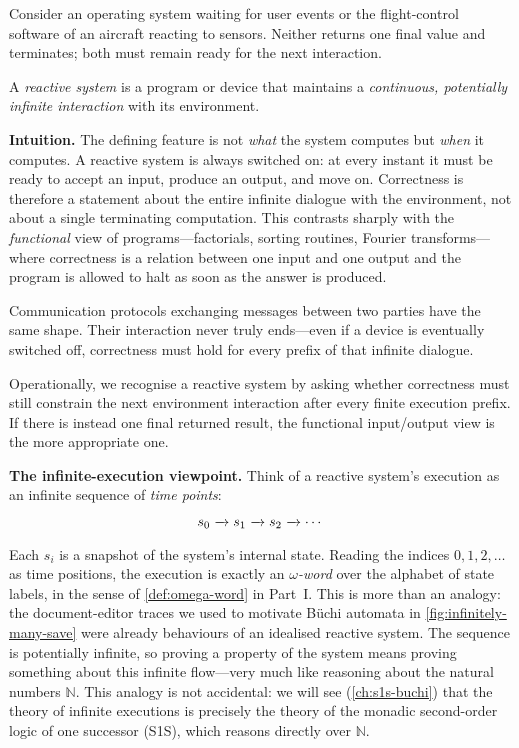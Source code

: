 Consider an operating system waiting for user events or the flight-control
software of an aircraft reacting to sensors.  Neither returns one final value
and terminates; both must remain ready for the next interaction.

\begin{definition}
A \emph{reactive system} is a program or device that maintains a
\emph{continuous, potentially infinite interaction} with its environment.
\end{definition}

\medskip\noindent
\textbf{Intuition.}  The defining feature is not \emph{what} the system
computes but \emph{when} it computes.  A reactive system is always
switched on: at every instant it must be ready to accept an input,
produce an output, and move on.  Correctness is therefore a statement
about the entire infinite dialogue with the environment, not about a
single terminating computation.  This contrasts sharply with the
\emph{functional} view of programs---factorials, sorting routines,
Fourier transforms---where correctness is a relation between one input
and one output and the program is allowed to halt as soon as the answer
is produced.

Communication protocols exchanging messages between two parties have the same
shape.  Their interaction never truly ends---even if a device is eventually
switched off, correctness must hold for every prefix of that infinite
dialogue.

Operationally, we recognise a reactive system by asking whether correctness
must still constrain the next environment interaction after every finite
execution prefix.  If there is instead one final returned result, the
functional input/output view is the more appropriate one.

\medskip\noindent
\textbf{The infinite-execution viewpoint.}  Think of a reactive system's
execution as an infinite sequence of \emph{time points}:
\[
  s_0 \xrightarrow[{\;\;}]{} s_1 \xrightarrow[{\;\;}]{} s_2 \xrightarrow[{\;\;}]{} \cdots
\]
Each $s_i$ is a snapshot of the system's internal state.  Reading the
indices $0, 1, 2, \ldots$ as time positions, the execution is exactly
an \emph{$\omega$-word} over the alphabet of state labels, in the sense
of \cref{def:omega-word} in Part~I.  This is more than an analogy: the
document-editor traces we used to motivate B\"uchi automata in
\cref{fig:infinitely-many-save} were already behaviours of an idealised
reactive system.  The sequence is potentially infinite, so proving a
property of the system means proving something about this infinite
flow---very much like reasoning about the natural numbers
$\mathbb{N}$.  This analogy is not accidental: we will see
(\cref{ch:s1s-buchi}) that the theory of infinite executions is
precisely the theory of the monadic second-order logic of one successor
(S1S), which reasons directly over $\mathbb{N}$.

